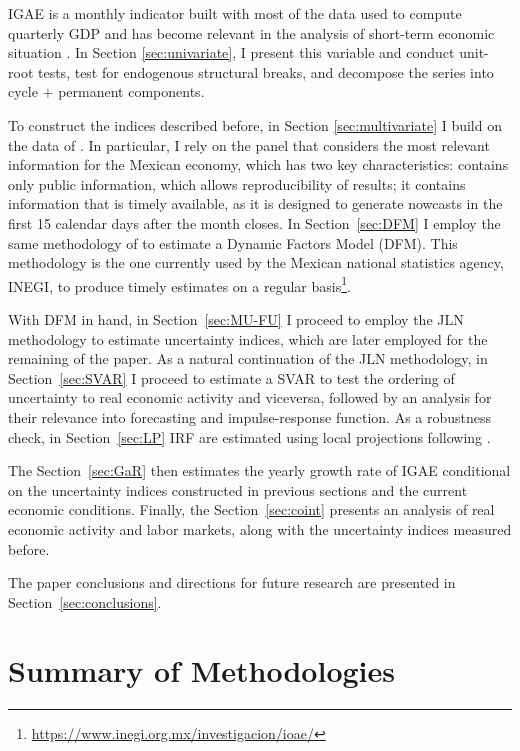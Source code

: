 \documentclass[12pt]{article}
\begin{document}
IGAE is a monthly indicator built with most of the data used to compute quarterly GDP and has become relevant in the analysis of short-term economic situation \citep{elizondo2019estimaciones}. In Section \ref{sec:univariate}, I present this variable and conduct unit-root tests, test for endogenous structural breaks, and decompose the series into cycle $+$ permanent components. 


To construct the indices described before, in Section \ref{sec:multivariate} I build on the data of \cite{corona2022timely}. In particular, I rely on the panel that considers the most relevant information for the Mexican economy, which has two key characteristics: contains only public information, which allows reproducibility of results; it contains information that is timely available, as it is designed to generate nowcasts in the first 15 calendar days after the month closes. In Section~\ref{sec:DFM} I employ the same methodology of \cite{corona2022timely} to estimate a Dynamic Factors Model (DFM). This methodology is the one currently used by the Mexican national statistics agency, INEGI, to produce timely estimates on a regular basis\footnote{\url{https://www.inegi.org.mx/investigacion/ioae/}}. 


With DFM in hand, in Section~\ref{sec:MU-FU} I proceed to employ the JLN methodology to estimate uncertainty indices, which are later employed for the remaining of the paper. As a natural continuation of the JLN methodology, in Section~\ref{sec:SVAR} I proceed to estimate a SVAR to test the ordering of uncertainty to real economic activity and viceversa, followed by an analysis for their relevance into forecasting and impulse-response function. As a robustness check, in Section~\ref{sec:LP} IRF are estimated using local projections following \cite{jorda2005estimation}. 

The Section~\ref{sec:GaR} then estimates the yearly growth rate of IGAE conditional on the uncertainty indices constructed in previous sections and the current economic conditions. Finally, the Section~\ref{sec:coint} presents an analysis of real economic activity and labor markets, along with the uncertainty indices measured before. 

The paper conclusions and directions for future research are presented in Section~\ref{sec:conclusions}.

\section{Summary of Methodologies}
\end{document}
